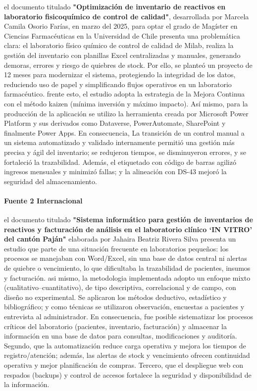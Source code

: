 \documentclass[12pt]{article} %
\begin{document}
el documento titulado  \textbf{\string"Optimización de inventario de reactivos en laboratorio fisicoquímico de control de calidad"}, desarrollada por Marcela Camila Osorio Farías, en marzo del 2025, para optar el grado de Magíster en Ciencias Farmacéuticas en la Universidad de Chile presenta una problemática clara: el laboratorio físico químico de control de calidad de Milab, realiza la gestión del inventario con planillas Excel centralizadas y manuales, generando demoras, errores y riesgo de quiebres de stock. Por ello, se planteó un proyecto de 12 meses para modernizar el sistema, protegiendo la integridad de los datos, reduciendo uso de papel y simplificando flujos operativos en un laboratorio farmacéutico. frente esto, el estudio adopta la estrategia de la Mejora Continua con el método kaizen (mínima inversión y máximo impacto). Así mismo, para la producción de la aplicación se utilizo la herramienta creada por Microsoft Power Platform y sus derivados como Dataverse, PowerAutomate, SharePoint y finalmente Power Apps. En consecuencia, La transición de un control manual a un sistema automatizado y validado internamente permitió una gestión más precisa y ágil del inventario; se redujeron tiempos, se disminuyeron errores, y se fortaleció la trazabilidad. Además, el etiquetado con código de barras agilizó ingresos mensuales y minimizó fallas; y la alineación con DS-43 mejoró la seguridad del almacenamiento.

\paragraph{Fuente 2 Internacional}

el documento titulado \textbf{"Sistema informático para gestión de inventarios de reactivos y facturación de análisis en el laboratorio clínico ‘IN VITRO’ del cantón Paján"} elaborada por Jahaira Beatriz Rivera Silva presenta un estudio que parte de una situación frecuente en laboratorios pequeños: los procesos se manejaban con Word/Excel, sin una base de datos central ni alertas de quiebre o vencimiento, lo que dificultaba la trazabilidad de pacientes, insumos y facturación. asi mismo, la metodologia implementada adopto un enfoque mixto (cualitativo–cuantitativo), de tipo descriptiva, correlacional y de campo, con diseño no experimental. Se aplicaron los métodos deductivo, estadístico y bibliográfico; y como técnicas se utilizaron observación, encuestas a pacientes y entrevista al administrador. En consecuencia, fue posible sistematizar los procesos críticos del laboratorio (pacientes, inventario, facturación) y almacenar la información en una base de datos para consultas, modificaciones y auditoría. Segundo, que la automatización reduce carga operativa y mejora los tiempos de registro/atención; además, las alertas de stock y vencimiento ofrecen continuidad operativa y mejor planificación de compras. Tercero, que el despliegue web con respados (backups) y control de accesos fortalece la seguridad y disponibilidad de la información.
\end{document}
